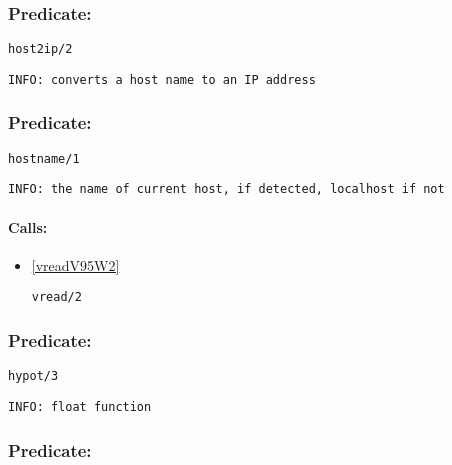 \subsubsection{Predicate:} \label{host2ipV95W2}

\begin{verbatim}
host2ip/2
\end{verbatim}

{\small \begin{verbatim}
INFO: converts a host name to an IP address

\end{verbatim}}

\subsubsection{Predicate:} \label{hostnameV95W1}

\begin{verbatim}
hostname/1
\end{verbatim}

{\small \begin{verbatim}
INFO: the name of current host, if detected, localhost if not

\end{verbatim}}
\paragraph{Calls:} 
\begin{itemize}
\item \ref{vreadV95W2} 
\begin{verbatim}
vread/2
\end{verbatim}

\end{itemize}

\subsubsection{Predicate:} \label{hypotV95W3}

\begin{verbatim}
hypot/3
\end{verbatim}

{\small \begin{verbatim}
INFO: float function

\end{verbatim}}

\subsubsection{Predicate:} \label{ifV95WanyV95W3}

